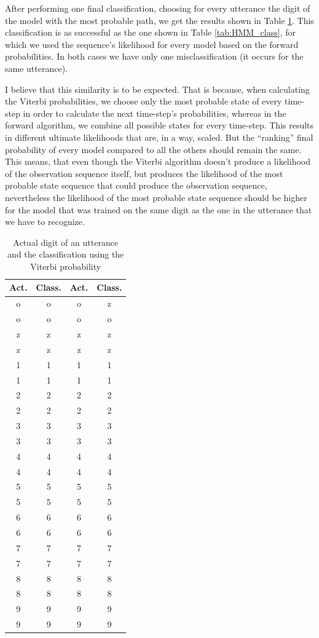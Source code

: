 \documentclass[12pt,a4paper,oneside]{article}
\begin{document}
After performing one final classification, choosing for every utterance the digit of the model with the most probable path, we get the results shown in Table \ref{tab:Viterbi_class}. This classification is as successful as the one shown in Table \ref{tab:HMM_class}, for which we used the sequence's likelihood for every model based on the forward probabilities. In both cases we have only one misclassification (it occurs for the same utterance).

I believe that this similarity is to be expected. That is because, when calculating the Viterbi probabilities, we choose only the most probable state of every time-step in order to calculate the next time-step's probabilities, whereas in the forward algorithm, we combine all possible states for every time-step. This results in different ultimate likelihoods that are, in a way, scaled. But the ``ranking'' final probability of every model compared to all the others should remain the same. This means, that even though the Viterbi algorithm doesn't produce a likelihood of the observation sequence itself, but produces the likelihood of the most probable state sequence that could produce the observation sequence, nevertheless the likelihood of the most probable state sequence should be higher for the model that was trained on the same digit as the one in the utterance that we have to recognize.

\begin{table}[!ht]
\begin{center}
\footnotesize
\caption{Actual digit of an utterance and the classification using the Viterbi probability} \label{tab:Viterbi_class}
    \begin{tabular}{||c|c||c|c||}
    \hline
    Act. & Class. & Act. & Class. \\
    \hline
    o & o & o & z \\
    o & o & o & o \\
    z & z & z & z \\
    z & z & z & z \\
    1 & 1 & 1 & 1 \\
    1 & 1 & 1 & 1 \\
    2 & 2 & 2 & 2 \\
    2 & 2 & 2 & 2 \\
    3 & 3 & 3 & 3 \\
    3 & 3 & 3 & 3 \\
    4 & 4 & 4 & 4 \\
    4 & 4 & 4 & 4 \\
    5 & 5 & 5 & 5 \\
    5 & 5 & 5 & 5 \\
    6 & 6 & 6 & 6 \\
    6 & 6 & 6 & 6 \\
    7 & 7 & 7 & 7 \\
    7 & 7 & 7 & 7 \\
    8 & 8 & 8 & 8 \\
    8 & 8 & 8 & 8 \\
    9 & 9 & 9 & 9 \\
    9 & 9 & 9 & 9 \\
    \hline
    \end{tabular}
    \end{center}
\end{table}
\end{document}
